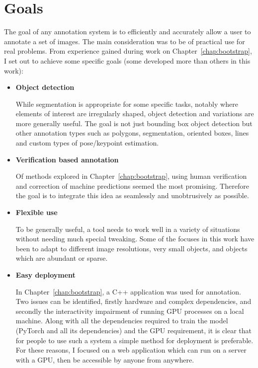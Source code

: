 \section {Goals}

The goal of any annotation system is to efficiently and accurately allow a user to annotate a set of images. The main consideration was to be of practical use for real problems. From experience gained during work on Chapter~\ref{chap:bootstrap}, I set out to achieve some specific goals (some developed more than others in this work):

\begin{itemize}

\item {\bf Object detection} \par
While segmentation is appropriate for some specific tasks, notably where elements of interest are irregularly shaped, object detection and variations are more generally useful. The goal is not just bounding box object detection but other annotation types such as polygons, segmentation, oriented boxes, lines and custom types of pose/keypoint estimation.

\item {\bf Verification based annotation} \par
Of methods explored in Chapter~\ref{chap:bootstrap}, using human verification and correction of machine predictions seemed the most promising. Therefore the goal is to integrate this idea as seamlessly and unobtrusively as possible. 

\item {\bf Flexible use} \par
To be generally useful, a tool needs to work well in a variety of situations without needing much special tweaking. Some of the focuses in this work have been to adapt to different image resolutions, very small objects, and objects which are abundant or sparse. 

\item {\bf Easy deployment} \par
In Chapter~\ref{chap:bootstrap}, a C++ application was used for annotation. Two issues can be identified, firstly hardware and complex dependencies, and secondly the interactivity impairment of running GPU processes on a local machine. Along with all the dependencies required to train the model (PyTorch \cite{Paszke2017} and all its dependencies) and the \gls{GPU} requirement, it is clear that for people to use such a system a simple method for deployment is preferable. For these reasons, I focused on a web application which can run on a server with a GPU, then be accessible by anyone from anywhere.


\end{itemize}

